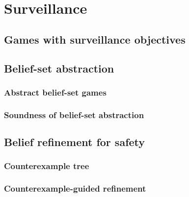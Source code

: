 
\chapter{Surveillance}




% 


\section{Games with surveillance objectives}\label{sec:gamedef}

%
%
\section{Belief-set abstraction}
\subsection{Abstract belief-set games}

%
\subsection{Soundness of belief-set abstraction}

%
%
%
\section{Belief refinement for safety}%

\subsection{Counterexample tree}

\subsection{Counterexample-guided refinement}

%
%
